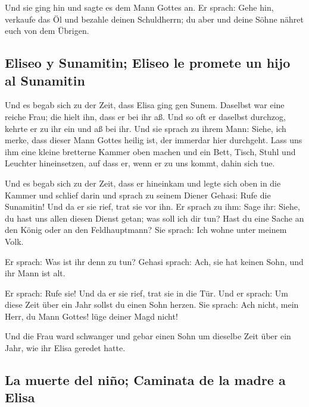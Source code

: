  Und sie ging hin und sagte es dem Mann Gottes an. Er
sprach: Gehe hin, verkaufe das Öl und bezahle deinen Schuldherrn; du
aber und deine Söhne nähret euch von dem Übrigen.

\hypertarget{eliseo-y-sunamitin-eliseo-le-promete-un-hijo-al-sunamitin}{%
\subsection{Eliseo y Sunamitin; Eliseo le promete un hijo al
Sunamitin}\label{eliseo-y-sunamitin-eliseo-le-promete-un-hijo-al-sunamitin}}

 Und es begab sich zu der Zeit, dass Elisa ging gen Sunem.
Daselbst war eine reiche Frau; die hielt ihn, dass er bei ihr aß. Und so
oft er daselbst durchzog, kehrte er zu ihr ein und aß bei ihr.
 Und sie sprach zu ihrem Mann: Siehe, ich merke, dass
dieser Mann Gottes heilig ist, der immerdar hier durchgeht.
 Lass uns ihm eine kleine bretterne Kammer oben machen
und ein Bett, Tisch, Stuhl und Leuchter hineinsetzen, auf dass er, wenn
er zu uns kommt, dahin sich tue.

 Und es begab sich zu der Zeit, dass er hineinkam und
legte sich oben in die Kammer und schlief darin  und
sprach zu seinem Diener Gehasi: Rufe die Sunamitin! Und da er sie rief,
trat sie vor ihn.  Er sprach zu ihm: Sage ihr: Siehe, du
hast uns allen diesen Dienst getan; was soll ich dir tun? Hast du eine
Sache an den König oder an den Feldhauptmann? Sie sprach: Ich wohne
unter meinem Volk.

 Er sprach: Was ist ihr denn zu tun? Gehasi sprach: Ach,
sie hat keinen Sohn, und ihr Mann ist alt.

 Er sprach: Rufe sie! Und da er sie rief, trat sie in die
Tür.  Und er sprach: Um diese Zeit über ein Jahr sollst
du einen Sohn herzen. Sie sprach: Ach nicht, mein Herr, du Mann Gottes!
lüge deiner Magd nicht!

 Und die Frau ward schwanger und gebar einen Sohn um
dieselbe Zeit über ein Jahr, wie ihr Elisa geredet hatte.

\hypertarget{la-muerte-del-niuxf1o-caminata-de-la-madre-a-elisa}{%
\subsection{La muerte del niño; Caminata de la madre a
Elisa}\label{la-muerte-del-niuxf1o-caminata-de-la-madre-a-elisa}}

